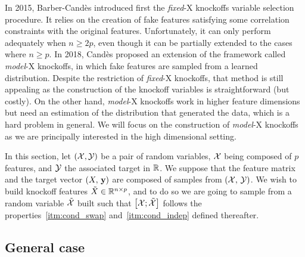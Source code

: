 In 2015, Barber-Candès introduced first the \textit{fixed}-X knockoffs variable selection procedure.
It relies on the creation of fake features satisfying some correlation constraints with the original features.
Unfortunately, it can only perform adequately when $n \geq 2p$,
even though it can be partially extended to the cases where $n \geq p$.
In 2018, Candès proposed an extension of the framework called \textit{model}-X knockoffs,
in which fake features are sampled from a learned distribution.
Despite the restriction of \textit{fixed}-X knockoffs, that method is still appealing as the construction of the
knockoff variables is straightforward (but costly).
On the other hand, \textit{model}-X knockoffs work in higher feature dimensions
but need an estimation of the distribution that generated the data,
which is a hard problem in general.
We will focus on the construction of \textit{model}-X knockoffs as we are principally interested in the
high dimensional setting.

In this section, let $(\mathcal{X}, \mathcal{Y})$ be a pair of random variables,
$\mathcal{X}$ being composed of $p$ features,
and $\mathcal{Y}$ the associated target in $\mathbb{R}$.
We suppose that the feature matrix and the target vector $(X,\, \mathbf{y})$ are composed of samples from $(\mathcal{X},\, \mathcal{Y})$.
We wish to build knockoff features $\tilde{X} \in \mathbb{R}^{n \times p}$, and to do so we are going to sample from a
random variable $\tilde{\mathcal{X}}$ built such that $\big[ \mathcal{X}; \tilde{\mathcal{X}} \big]$
follows the properties~\ref{itm:cond_swap} and~\ref{itm:cond_indep} defined thereafter.

\subsection{General case}\label{subsec:general_case}

